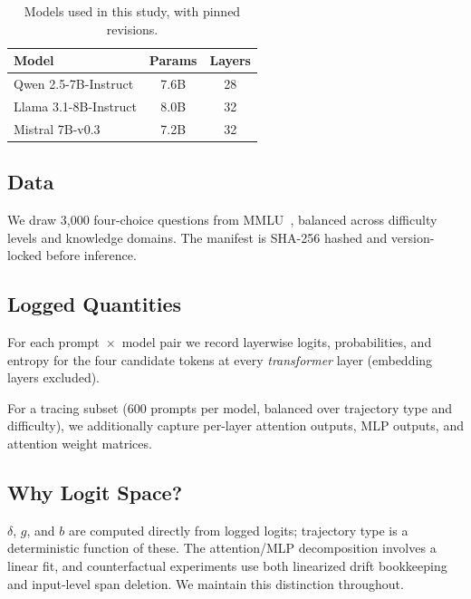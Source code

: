 \documentclass{article}
\begin{document}
\begin{table}[t]
  \caption{Models used in this study, with pinned revisions.}
  \label{tab:models}
  \vskip 0.1in
  \begin{center}
  \begin{small}
  \begin{sc}
  \begin{tabular}{lcc}
    \toprule
    Model & Params & Layers \\
    \midrule
    Qwen 2.5-7B-Instruct  & 7.6B & 28 \\
    Llama 3.1-8B-Instruct  & 8.0B & 32 \\
    Mistral 7B-v0.3 & 7.2B & 32 \\
    \bottomrule
  \end{tabular}
  \end{sc}
  \end{small}
  \end{center}
\end{table}

\subsection{Data}

We draw 3{,}000 four-choice questions from MMLU~\cite{hendrycks2021}, balanced across difficulty levels and knowledge domains.  The manifest is SHA-256 hashed and version-locked before inference.

\subsection{Logged Quantities}

For each prompt~$\times$~model pair we record layerwise logits, probabilities, and entropy for the four candidate tokens at every \emph{transformer} layer (embedding layers excluded).

For a tracing subset (600 prompts per model, balanced over trajectory type and difficulty), we additionally capture per-layer attention outputs, MLP outputs, and attention weight matrices.

\subsection{Why Logit Space?}

$\delta$, $g$, and $b$ are computed directly from logged logits; trajectory type is a deterministic function of these.  The attention/MLP decomposition involves a linear fit, and counterfactual experiments use both linearized drift bookkeeping and input-level span deletion.  We maintain this distinction throughout.
\end{document}
